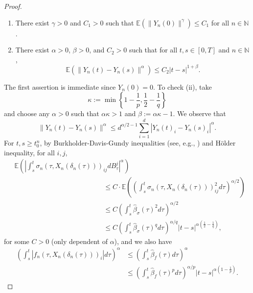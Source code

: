 \documentclass[preprint,12pt]{elsarticle}
\newcommand{\N}{\mathbb{N}}
\theoremstyle{plain}
\theoremstyle{definition}
\theoremstyle{remark}
\begin{document}
\begin{proof}
		\begin{enumerate}
			\item [(i)] There exist $\gamma>0$ and $C_1>0$ such that $\mathbb{E}(\|Y_n(0)\|^\gamma)\leq C_1$ for all $n\in\N$.
			\item [(ii)] There exist $\alpha>0$, $\beta>0$, and $C_2>0$ such that for all $t,s\in [0,T]$ and $n\in\N$, 
        $$\mathbb{E}(\|Y_n(t)-Y_n(s)\|^\alpha)\leq C_2|t-s|^{1+\beta}.$$
		\end{enumerate}
		The first assertion is immediate since $Y_n(0) = 0$. To check (ii), take $$\kappa:= \min\left\{1-\frac{1}{p},\frac{1}{2}-\frac{1}{q}\right\}$$ and choose any $\alpha>0$ such that $\alpha\kappa>1$ and $\beta := \alpha\kappa-1$. We observe that
		\begin{equation*}
			\|Y_n(t)-Y_n(s)\|^\alpha \leq d^{\alpha/2 - 1}\sum_{i=1}^d |Y_n(t)_i-Y_n(s)_i|^\alpha.
		\end{equation*}
For $t,s\geq t_0^n$, by Burkholder-Davis-Gundy inequalities (see, e.g., \cite[Problem 3.29, p. 166]{MR1121940}) and Hölder inequality, for all $i,j$,
		\begin{equation*}
			\begin{aligned}
				&\mathbb{E}\left( \left|\int_{s}^{t}\sigma_n(\tau,X_n(\delta_n(\tau)))_{ij}dB_\tau^j\right|^\alpha \right)\\
				&\quad\quad   \quad\quad\quad\quad\quad\quad\quad\quad\quad\quad\quad \leq   C\cdot \mathbb{E}\left(\left(\int_{s}^{t}\sigma_n(\tau,X_n(\delta_n(\tau)))^2_{ij} d\tau\right)^{\alpha/2}\right)\\
				&\quad\quad \quad\quad\quad\quad\quad\quad \quad\quad\quad\quad\quad \leq   C\left(\int_s^t\hat{\beta}_\sigma(\tau)^2d\tau\right)^{\alpha/2}\\
                &\quad\quad \quad\quad\quad\quad\quad\quad \quad\quad\quad\quad\quad \leq   C\left(\int_s^t\hat{\beta}_\sigma(\tau)^qd\tau\right)^{\alpha/q}|t-s|^{\alpha\left(\frac{1}{2}-\frac{1}{q}\right)},
			\end{aligned}
		\end{equation*}
		for some $C>0$ (only dependent of $\alpha$), and we also have 
        \begin{equation*}
            \begin{aligned}
            \left(\int_{s}^{t} |f_n(\tau,X_n(\delta_n(\tau)))_i|d\tau\right)^\alpha &\leq \left(\int_s^t \hat\beta_f(\tau)d\tau\right)^\alpha \\
            &\leq \left(\int_s^t \hat\beta_f(\tau)^pd\tau\right)^{\alpha/p}|t-s|^{\alpha\left(1-\frac{1}{p}\right)}.

\end{aligned}
\end{equation*}
\end{proof}
\end{document}
